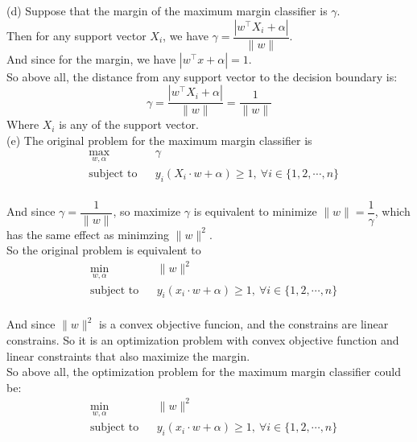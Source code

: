 \documentclass[10pt]{article}
\begin{document}
\begin{enumerate}[1.]
(d) Suppose that the margin of the maximum margin classifier is $\gamma$.\\
Then for any support vector $X_i$, we have $\gamma = \dfrac{|w^{\top}X_i + \alpha|}{\|w\|}$.\\
And since for the margin, we have $|w^{\top}x+\alpha|=1$.\\
So above all, the distance from any support vector to the decision boundary is:
$$\gamma = \dfrac{|w^{\top}X_i + \alpha|}{\|w\|}=\dfrac{1}{\|w\|}$$
Where $X_i$ is any of the support vector.\\

(e) The original problem for the maximum margin classifier is
\begin{equation}
  \begin{aligned}
    & \max_{w,\alpha}
    & & \gamma \\
    & \text{subject to}
    & & y_i(X_i\cdot w+\alpha)\geq 1,\ \forall i\in\{1,2,\cdots,n\} \\
  \end{aligned}
\end{equation}

And since $\gamma=\dfrac{1}{\|w\|}$, so maximize $\gamma$ is equivalent to minimize $\|w\|=\dfrac{1}{\gamma}$, which has the same 
effect as minimzing $\|w\|^2$.\\ 
So the original problem is equivalent to
\begin{equation}
  \begin{aligned}
    & \min_{w,\alpha}
    & & \|w\|^2 \\
    & \text{subject to}
    & & y_i(x_i\cdot w+\alpha)\geq 1,\ \forall i\in\{1,2,\cdots,n\} \\
  \end{aligned}
\end{equation}

And since $\|w\|^2$ is a convex objective funcion, and the constrains are linear constrains. So it is an optimization problem with convex objective function and linear constraints that also maximize the margin.\\
So above all, the optimization problem for the maximum margin classifier could be:
\begin{equation}
  \begin{aligned}
    & \min_{w,\alpha}
    & & \|w\|^2 \\
    & \text{subject to}
    & & y_i(x_i\cdot w+\alpha)\geq 1,\ \forall i\in\{1,2,\cdots,n\} \\
  \end{aligned}
\end{equation}


\end{enumerate}
\end{document}
